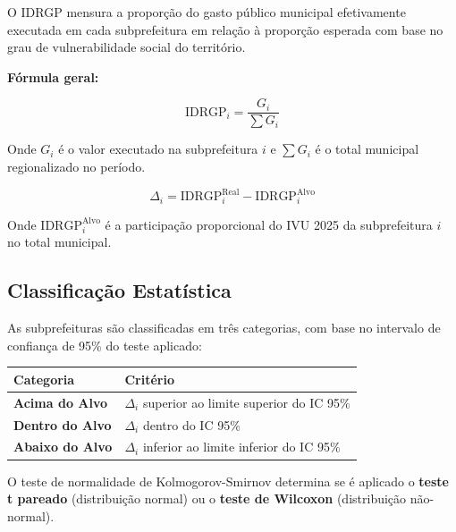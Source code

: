 \documentclass[
  brazilian,
  12pt,
]{article}
\newcounter{none} %
\begin{document}
O IDRGP mensura a proporção do gasto público municipal efetivamente
executada em cada subprefeitura em relação à proporção esperada com base
no grau de vulnerabilidade social do território.

\textbf{Fórmula geral:}

\[\text{IDRGP}_i = \frac{G_i}{\sum G_i}\]

Onde \(G_i\) é o valor executado na subprefeitura \(i\) e \(\sum G_i\) é
o total municipal regionalizado no período.

\[\Delta_i = \text{IDRGP}_{i}^{\text{Real}} - \text{IDRGP}_{i}^{\text{Alvo}}\]

Onde \(\text{IDRGP}_{i}^{\text{Alvo}}\) é a participação proporcional do
IVU 2025 da subprefeitura \(i\) no total municipal.

\subsection{Classificação
Estatística}\label{classificauxe7uxe3o-estatuxedstica}

As subprefeituras são classificadas em três categorias, com base no
intervalo de confiança de 95\% do teste aplicado:

{\def\LTcaptype{none} %
\begin{longtable}[]{@{}
  >{\raggedright\arraybackslash}p{}
  >{\raggedright\arraybackslash}p{}@{}}
\toprule\noalign{}
\begin{minipage}[b]{\linewidth}\raggedright
Categoria
\end{minipage} & \begin{minipage}[b]{\linewidth}\raggedright
Critério
\end{minipage} \\
\midrule\noalign{}
\endhead
\bottomrule\noalign{}
\endlastfoot
\textbf{Acima do Alvo} & \(\Delta_i\) superior ao limite superior do IC
95\% \\
\textbf{Dentro do Alvo} & \(\Delta_i\) dentro do IC 95\% \\
\textbf{Abaixo do Alvo} & \(\Delta_i\) inferior ao limite inferior do IC
95\% \\
\end{longtable}
}

O teste de normalidade de Kolmogorov-Smirnov determina se é aplicado o
\textbf{teste t pareado} (distribuição normal) ou o \textbf{teste de
Wilcoxon} (distribuição não-normal).
\end{document}

